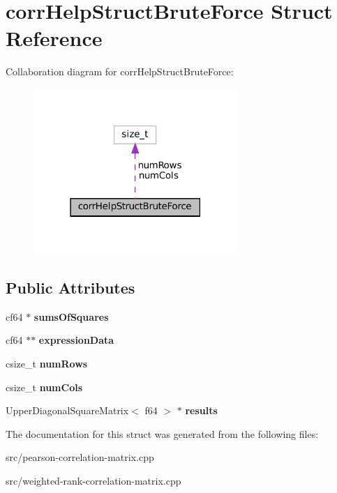 \hypertarget{structcorrHelpStructBruteForce}{}\section{corr\+Help\+Struct\+Brute\+Force Struct Reference}
\label{structcorrHelpStructBruteForce}


Collaboration diagram for corr\+Help\+Struct\+Brute\+Force\+:\nopagebreak
\begin{figure}[H]
\begin{center}
\leavevmode
\includegraphics[width=219pt]{structcorrHelpStructBruteForce__coll__graph}
\end{center}
\end{figure}
\subsection*{Public Attributes}
\begin{DoxyCompactItemize}
\item 
\mbox{\label{structcorrHelpStructBruteForce_af39d58f3d09b7ad663f82af75521c37a}} 
cf64 $\ast$ {\bfseries sums\+Of\+Squares}
\item 
\mbox{\label{structcorrHelpStructBruteForce_a09a788c0291943229b3540daeb8b4e5c}} 
cf64 $\ast$$\ast$ {\bfseries expression\+Data}
\item 
\mbox{\label{structcorrHelpStructBruteForce_a645d896963ade023a1ff805724e0a2e1}} 
csize\+\_\+t {\bfseries num\+Rows}
\item 
\mbox{\label{structcorrHelpStructBruteForce_a37303b729c3b46e812efe834098f837a}} 
csize\+\_\+t {\bfseries num\+Cols}
\item 
\mbox{\label{structcorrHelpStructBruteForce_a899ff1d82082fa63faa08d297147f95a}} 
Upper\+Diagonal\+Square\+Matrix$<$ f64 $>$ $\ast$ {\bfseries results}
\end{DoxyCompactItemize}


The documentation for this struct was generated from the following files\+:\begin{DoxyCompactItemize}
\item 
src/pearson-\/correlation-\/matrix.\+cpp\item 
src/weighted-\/rank-\/correlation-\/matrix.\+cpp\end{DoxyCompactItemize}
